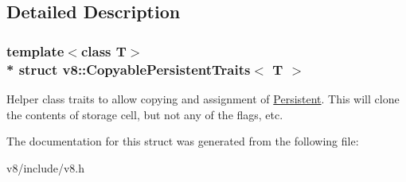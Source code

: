\subsection{Detailed Description}
\subsubsection*{template$<$class T$>$\\*
struct v8\+::\+Copyable\+Persistent\+Traits$<$ T $>$}

Helper class traits to allow copying and assignment of \hyperlink{classv8_1_1Persistent}{Persistent}. This will clone the contents of storage cell, but not any of the flags, etc. 

The documentation for this struct was generated from the following file\+:\begin{DoxyCompactItemize}
\item 
v8/include/v8.\+h\end{DoxyCompactItemize}

